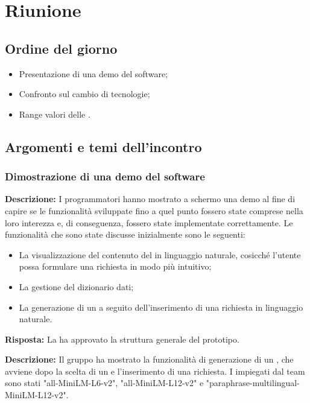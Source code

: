 \section{Riunione}
\subsection{Ordine del giorno}
\begin{itemize}
	\item Presentazione di una demo del software;
	\item Confronto sul cambio di tecnologie;
	\item Range valori delle .
\end{itemize}

\subsection{Argomenti e temi dell'incontro}

\subsubsection{Dimostrazione di una demo del software}

\par \textbf{Descrizione:} I programmatori hanno mostrato a schermo una demo al fine di capire se le funzionalità sviluppate fino a quel punto fossero state comprese nella loro interezza e, di conseguenza, fossero state implementate correttamente. Le funzionalità che sono state discusse inizialmente sono le seguenti: 
\begin{itemize}
	\item La visualizzazione del contenuto del  in linguaggio naturale, cosicché l'utente possa formulare una richiesta in modo più intuitivo;
	\item La gestione  del dizionario dati;
	\item La generazione di un  a seguito dell'inserimento di una richiesta in linguaggio naturale.
	
\end{itemize}

\par \textbf{Risposta:} La  ha approvato la struttura generale del prototipo.

\par \textbf{Descrizione:} Il gruppo ha mostrato la funzionalità di generazione di un , che avviene dopo la scelta di un  e l'inserimento di una richiesta. I  impiegati dal team sono stati "all-MiniLM-L6-v2", "all-MiniLM-L12-v2" e "paraphrase-multilingual-MiniLM-L12-v2".

